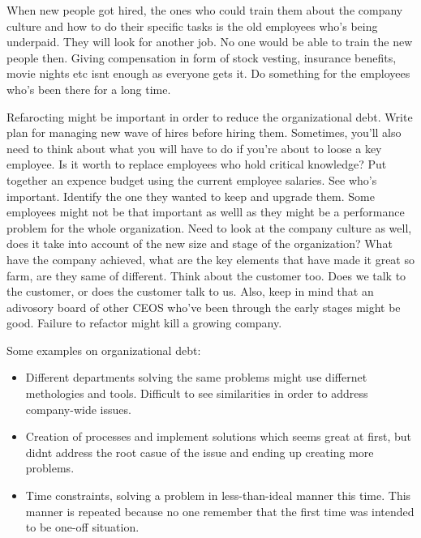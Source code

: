 When new people got hired, the ones who could train them about the company culture and how to do their specific tasks is the old employees who's being underpaid. They will look for another job. No one would be able to train the new people then. Giving compensation in form of stock vesting, insurance benefits, movie nights etc isnt enough as everyone gets it. Do something for the employees who's been there for a long time.

Refarocting might be important in order to reduce the organizational debt. Write plan for managing new wave of hires before hiring them. Sometimes, you'll also need to think about what you will have to do if you're about to loose a key employee. Is it worth to replace employees who hold critical knowledge? Put together an expence budget using the current employee salaries. See who's important. Identify the one they wanted to keep and upgrade them. Some employees might not be that important as welll as they might be a performance problem for the whole organization. Need to look at the company culture as well, does it take into account of the new size and stage of the organization? What have the company achieved, what are the key elements that have made it great so farm, are they same of different. Think about the customer too. Does we talk to the customer, or does the customer talk to us. Also, keep in mind that an adivosory board of other CEOS who've been through the early stages might be good. Failure to refactor might kill a growing company\cite{steve-blank}.

Some examples on organizational debt:
\begin{itemize}
	\item Different departments solving the same problems might use differnet methologies and tools. Difficult to see similarities in order to address company-wide issues.
	\item Creation of processes and implement solutions which seems great at first, but didnt address the root casue of the issue and ending up creating more problems.
	\item Time constraints, solving a problem in less-than-ideal manner this time. This manner is repeated because no one remember that the first time was intended to be one-off situation.
\end{itemize}




